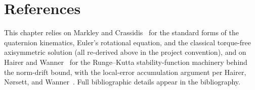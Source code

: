 \section{References}
\label{sec:rigidbody:references}

This chapter relies on Markley and Crassidis~\cite{markley2014} for the
standard forms of the quaternion kinematics, Euler's rotational equation,
and the classical torque-free axisymmetric solution (all re-derived above
in the project convention), and on Hairer and Wanner~\cite{hairer1996} for
the Runge--Kutta stability-function machinery behind the norm-drift bound,
with the local-error accumulation argument per Hairer, N{\o}rsett, and
Wanner~\cite{hairer1993}. Full bibliographic details appear in the
bibliography.
